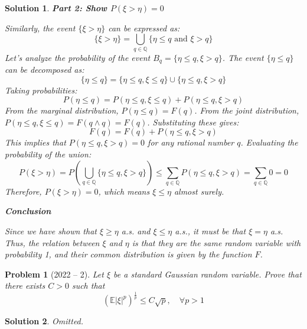 \documentclass[12pt]{amsart}
\newtheorem{problem}{Problem}
\newtheorem*{solution}{Solution}
\begin{document}
\begin{solution}
    \textbf{Part 2: Show $P(\xi > \eta) = 0$}
    
    Similarly, the event $\{\xi > \eta\}$ can be expressed as:
    $$ \{\xi > \eta\} = \bigcup_{q \in \mathbb{Q}} \{\eta \le q \text{ and } \xi > q\} $$
    Let's analyze the probability of the event $B_q = \{\eta \le q, \xi > q\}$.
    The event $\{\eta \le q\}$ can be decomposed as:
    $$ \{\eta \le q\} = \{\eta \le q, \xi \le q\} \cup \{\eta \le q, \xi > q\} $$
    Taking probabilities:
    $$ P(\eta \le q) = P(\eta \le q, \xi \le q) + P(\eta \le q, \xi > q) $$
    From the marginal distribution, $P(\eta \le q) = F(q)$.
    From the joint distribution, $P(\eta \le q, \xi \le q) = F(q \wedge q) = F(q)$.
    Substituting these gives:
    $$ F(q) = F(q) + P(\eta \le q, \xi > q) $$
    This implies that $P(\eta \le q, \xi > q) = 0$ for any rational number $q$.
    Evaluating the probability of the union:
    $$ P(\xi > \eta) = P\left(\bigcup_{q \in \mathbb{Q}} \{\eta \le q, \xi > q\}\right) \le \sum_{q \in \mathbb{Q}} P(\eta \le q, \xi > q) = \sum_{q \in \mathbb{Q}} 0 = 0 $$
    Therefore, $P(\xi > \eta) = 0$, which means $\xi \le \eta$ almost surely.
    
    \textbf{Conclusion}
    
    Since we have shown that $\xi \ge \eta$ a.s. and $\xi \le \eta$ a.s., it must be that $\xi = \eta$ a.s.
    Thus, the relation between $\xi$ and $\eta$ is that they are the same random variable with probability 1, and their common distribution is given by the function $F$.
\end{solution}

\begin{problem}[2022 -- 2]
Let $\xi$ be a standard Gaussian random variable. Prove that there exists $C>0$ such that
$$
(\mathbb{E}|\xi|^p)^{\frac{1}{p}} \leq C \sqrt{p}, \quad \forall p>1
$$
\end{problem}

\begin{solution}
    Omitted.
\end{solution}
\end{document}
